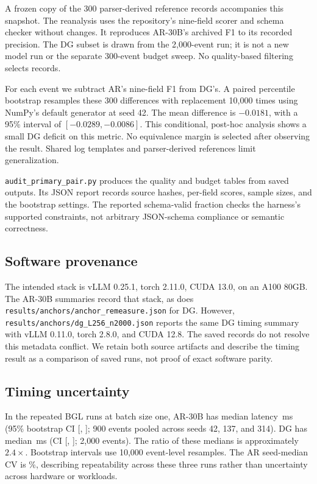 A frozen copy of the 300 parser-derived reference records accompanies this
snapshot. The reanalysis uses the repository's nine-field scorer and schema
checker without changes. It reproduces AR-30B's archived F1 to its recorded
precision. The DG subset is drawn from the 2,000-event run; it is not a new
model run or the separate 300-event budget sweep. No quality-based filtering
selects records.

For each event we subtract AR's nine-field F1 from DG's. A paired percentile
bootstrap resamples these 300 differences with replacement 10,000 times
using NumPy's default generator at seed 42. The mean difference is
$-0.0181$, with a 95\% interval of $[-0.0289,-0.0086]$.
This conditional, post-hoc analysis shows a small DG deficit on this metric.
No equivalence margin is selected after observing the result. Shared log
templates and parser-derived references limit generalization.

\texttt{audit\_primary\_pair.py} produces the quality and budget tables
from saved outputs. Its JSON report records source hashes, per-field scores,
sample sizes, and the bootstrap settings. The reported schema-valid fraction
checks the harness's supported constraints, not arbitrary JSON-schema
compliance or semantic correctness.

\subsection{Software provenance}
The intended stack is vLLM 0.25.1, torch 2.11.0, CUDA 13.0, on an A100 80GB.
The AR-30B summaries record that stack, as does
\texttt{results/anchors/anchor\_remeasure.json} for DG.
However, \texttt{results/anchors/dg\_L256\_n2000.json} reports the same
DG timing summary with vLLM 0.11.0, torch 2.8.0, and CUDA 12.8.
The saved records do not resolve this metadata conflict. We retain both
source artifacts and describe the timing result as a comparison of saved
runs, not proof of exact software parity.

\subsection{Timing uncertainty}

In the repeated BGL runs at batch size one, AR-30B has median latency
\arMedian\,ms (95\% bootstrap CI [\arCiLo, \arCiHi]; 900 events
pooled across seeds 42, 137, and 314). DG has median \dgMedian\,ms
(CI [\dgCiLo, \dgCiHi]; 2,000 events). The ratio of these medians
is approximately $2.4\times$. Bootstrap intervals use 10,000 event-level
resamples. The AR seed-median CV is \seedCV\%, describing repeatability
across these three runs rather than uncertainty across hardware or workloads.

